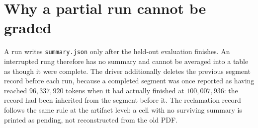 \section{Why a partial run cannot be graded}

A run writes \texttt{summary.json} only after the held-out evaluation finishes. An
interrupted rung therefore has no summary and cannot be averaged into a table as
though it were complete. The driver additionally deletes the previous segment
record before each run, because a completed segment was once reported as having
reached $96{,}337{,}920$ tokens when it had actually finished at $100{,}007{,}936$:
the record had been inherited from the segment before it. The reclamation record
follows the same rule at the artifact level: a cell with no surviving summary is
printed as pending, not reconstructed from the old PDF.
